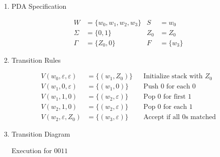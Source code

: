 \documentclass[12pt,a4paper,openany]{article}
\begin{document}
\begin{enumerate}

\item PDA Specification

\begin{align*}
W &= \{w_0, w_1, w_2, w_3\} & S &= w_0 \\
\Sigma &= \{0, 1\} & Z_0 &= Z_0 \\
\Gamma &= \{Z_0, 0\} & F &= \{w_3\} 
\end{align*}

\item Transition Rules

\begin{align*}
V(w_0, \varepsilon, \varepsilon) &= \{(w_1, Z_0)\} && \text{Initialize stack with $Z_0$} \\
V(w_1, 0, \varepsilon) &= \{(w_1, 0)\} && \text{Push 0 for each 0} \\
V(w_1, 1, 0) &= \{(w_2, \varepsilon)\} && \text{Pop 0 for first 1} \\
V(w_2, 1, 0) &= \{(w_2, \varepsilon)\} && \text{Pop 0 for each 1} \\
V(w_2, \varepsilon, Z_0) &= \{(w_3, \varepsilon)\} && \text{Accept if all 0s matched}
\end{align*}

\item Transition Diagram

\begin{center}
\end{center}

Execution for $0011$


\end{enumerate}
\end{document}
